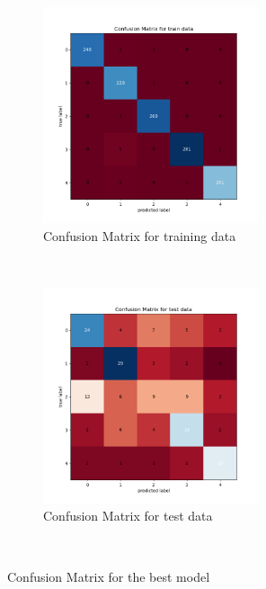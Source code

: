 \begin{figure}[!ht]
    \centering
    \begin{subfigure}[t]{0.5\textwidth}
        \centering
        \includegraphics[height=2.5in]{Dataset_2a/dataset_2a_cmatrix_train_data_svc.png}
        \caption{Confusion Matrix for training data}
    \end{subfigure}%
    ~ 
    \begin{subfigure}[t]{0.5\textwidth}
        \centering
        \includegraphics[height=2.5in]{Dataset_2a/dataset_2a_cmatrix_test_data_svc.png}
        \caption{Confusion Matrix for test data}
    \end{subfigure}%
    ~
    \caption{Confusion Matrix for the best model}
    \label{fig:13}
\end{figure}

